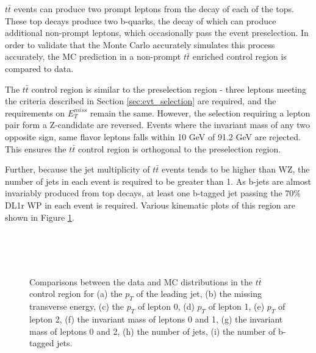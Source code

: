 $t\bar{t}$ events can produce two prompt leptons from the decay of each of the tops. These top decays produce two b-quarks, the decay of which can produce additional non-prompt leptons, which occasionally pass the event preselection. In order to validate that the Monte Carlo accurately simulates this process accurately, the MC prediction in a non-prompt $t\bar{t}$ enriched control region is compared to data.

The $t\bar{t}$ control region is similar to the preselection region - three leptons meeting the criteria described in Section \ref{sec:evt_selection} are required, and the requirements on $E_T^{miss}$ remain the same. However, the selection requiring a lepton pair form a Z-candidate are reversed. Events where the invariant mass of any two opposite sign, same flavor leptons falls within 10 GeV of 91.2 GeV are rejected. This ensures the $t\bar{t}$ control region is orthogonal to the preselection region. 

Further, because the jet multiplicity of $t\bar{t}$ events tends to be higher than WZ, the number of jets in each event is required to be greater than 1. As b-jets are almost invariably produced from top decays, at least one b-tagged jet passing the 70\% DL1r WP in each event is required. Various kinematic plots of this region are shown in Figure \ref{fig:ttbar_noScale}.

\begin{figure}[H] 
    \centering
    \\
    \\
    \\
    \caption{Comparisons between the data and MC distributions in the $t\bar{t}$ control region for (a) the $p_T$ of the leading jet, (b) the missing transverse energy, (c) the $p_T$ of lepton 0, (d) $p_T$ of lepton 1, (e) $p_T$ of lepton 2, (f) the invariant mass of leptons 0 and 1, (g) the invariant mass of leptons 0 and 2, (h) the number of jets, (i) the number of b-tagged jets.}
    \label{fig:ttbar_noScale}
\end{figure}

